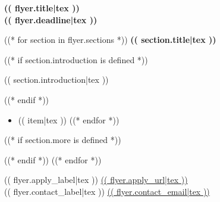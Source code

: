 \documentclass[11pt]{article}
\begin{document}
\raggedright
\begin{center}
{\fontsize{16}{18}\selectfont\bfseries\color{UHRed}(( flyer.title|tex ))}\\[3pt]
{\bfseries (( flyer.deadline|tex ))}
\end{center}
\vspace{-7pt}
((* for section in flyer.sections *))
{\bfseries\color{UHRed}(( section.title|tex ))}\par
((* if section.introduction is defined *))
\vspace{3pt}\hspace*{18pt}\begin{minipage}{\dimexpr\linewidth-18pt}
(( section.introduction|tex ))
\end{minipage}
((* endif *))
\begin{itemize}
((* for item in section['items'] *))
\item (( item|tex ))
((* endfor *))
\end{itemize}
((* if section.more is defined *))
\par
((* endif *))
\vspace{5pt}
((* endfor *))
\begin{center}
(( flyer.apply_label|tex )) \href{(( flyer.apply_url|tex ))}{(( flyer.apply_url|tex ))}\\[2pt]
(( flyer.contact_label|tex )) \href{mailto:(( flyer.contact_email|tex ))}{(( flyer.contact_email|tex ))}
\end{center}
\end{document}

